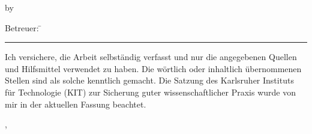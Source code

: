 \begin{titlepage}
{\begin{flushleft}
	\vspace{2cm}\hspace*{-1.7cm}						%
	\parbox[t][3cm][t]{13.5cm}
		{
			\LARGE	
			\centerline{\doctype}
			\centerline{by}
			\centerline{\bfseries\docauthor}
		} 		
\end{flushleft}
	\ifthenelse{\equal{\betreuerII}{}}
	{
		\vspace*{2cm}\hspace*{-1.7cm}
	}
	{
		\vspace*{2cm}\vspace*{-\baselineskip}\hspace*{-1.7cm}
	}
	\parbox[t][1cm][t]{13.5cm}
	{
		\ifthenelse{\equal{\betreuerII}{}}
		{
		}
		{
		\begin{tabbing}
			\Large\sffamily Betreuer: \= \Large\sffamily\bfseries\betreuerI\\
			\> \Large\sffamily\bfseries\betreuerII
		\end{tabbing}
		\vspace*{-\baselineskip}
		}
		\vspace*{0.5cm}
		\hrule
		\vspace*{0.5cm}
		\leftline{\Large\sffamily \monthword{\month}~\the\year}																		
	}
}
\cleardoublepage

\pagestyle{empty}
\vspace*{0.1cm}
Ich versichere, die Arbeit selbständig verfasst und nur die angegebenen Quellen und Hilfsmittel verwendet zu haben. Die wörtlich oder inhaltlich übernommenen Stellen sind als solche kenntlich gemacht. Die Satzung des Karlsruher Instituts für Technologie (KIT) zur Sicherung guter wissenschaftlicher Praxis wurde von mir in der aktuellen Fassung beachtet.
\vspace*{3cm}
\begin{center}
\doclocation, \docdate
\end{center}
\cleardoublepage
\end{titlepage}
